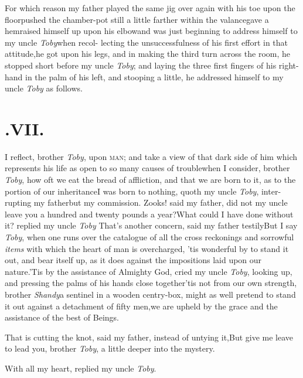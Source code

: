 \documentclass{article}
\begin{document}
For which reason my father played the same jig over again with
his toe upon the floor\tsh pushed the chamber-pot still a
little farther within the valance\tsk gave a hem\tsk raised
himself up upon his elbow\tsk and was just beginning to address
himself to my uncle \textit{Toby}\tsk when recol-
lecting the unsuccessfulness of his first effort in that
attitude,\tsk he got upon his legs, and in making the third
turn across the room, he stopped short before my uncle
\textit{Toby}; and laying the three first\break
fingers of his right-hand in the palm of his left, and stooping a little,
he addressed himself to my uncle \textit{Toby} as follows.

\bigskip
\section{.\enspace VII.}

 I reflect, brother \textit{Toby},\break
upon \textsc{man}; and take a view of\break
that dark side of him which represents his life as open to
so many causes of trouble\tsk when I consider, brother
\textit{Toby}, how oft we eat the bread of affliction, and
that we are born to it, as to the portion of our
inheritance\tsk I was born to nothing, quoth my uncle
\textit{Toby}, inter-
rupting my father\tsk but my commission.
Zooks! said my father, did not my uncle leave you a hundred
and twenty pounds a year?\tsk What could I have done without
it? replied my uncle \textit{Toby} \tsk That’s another
concern, said my father testily\tsk\break But I say \textit{Toby},
when one runs over the catalogue of all the cross reckonings
and sorrowful \textit{items} with which the heart of man is
overcharged, ’tis wonderful by  to stand it out, and bear itself up, as it
does against the impositions laid upon our nature.\tsh ’Tis
by the assistance of Almighty God, cried my uncle
\textit{Toby}, looking up, and pressing the palms of his
hands close together\tsk ’tis not from our own strength,
brother \textit{Shandy}\tsk a sentinel in a wooden
centry-box, might as well pretend to stand it out against a
detachment of fifty men,\tsk we are upheld by the grace and
the assistance of the best of Beings.

\tsk That is cutting the knot, said my father, instead
of untying it,\tsk But give me leave to lead you, brother
\textit{Toby}, a little deeper into the mystery.

With all my heart, replied my uncle \textit{Toby}.
\end{document}

